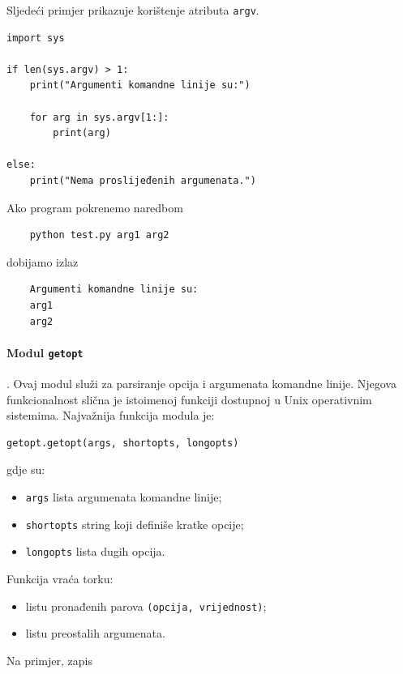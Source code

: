 Sljedeći primjer prikazuje korištenje atributa \texttt{argv}.

\begin{verbatim}
import sys

if len(sys.argv) > 1:
    print("Argumenti komandne linije su:")

    for arg in sys.argv[1:]:
        print(arg)

else:
    print("Nema proslijeđenih argumenata.")
\end{verbatim}

Ako program pokrenemo naredbom

\begin{verbatim}
	python test.py arg1 arg2
\end{verbatim}

dobijamo izlaz

\begin{verbatim}
	Argumenti komandne linije su:
	arg1
	arg2
\end{verbatim}

\paragraph{Modul \texttt{getopt}}.   Ovaj modul služi za parsiranje opcija i argumenata komandne linije. Njegova funkcionalnost slična je istoimenoj funkciji dostupnoj u Unix operativnim sistemima. Najvažnija funkcija modula je:

\begin{verbatim}
getopt.getopt(args, shortopts, longopts)
\end{verbatim}

gdje su:

\begin{itemize}
	\item \texttt{args} lista argumenata komandne linije;
	\item \texttt{shortopts} string koji definiše kratke opcije;
	\item \texttt{longopts} lista dugih opcija.
\end{itemize}

Funkcija vraća torku:

\begin{itemize}
	\item listu pronađenih parova \texttt{(opcija, vrijednost)};
	\item listu preostalih argumenata.
\end{itemize}

Na primjer, zapis

